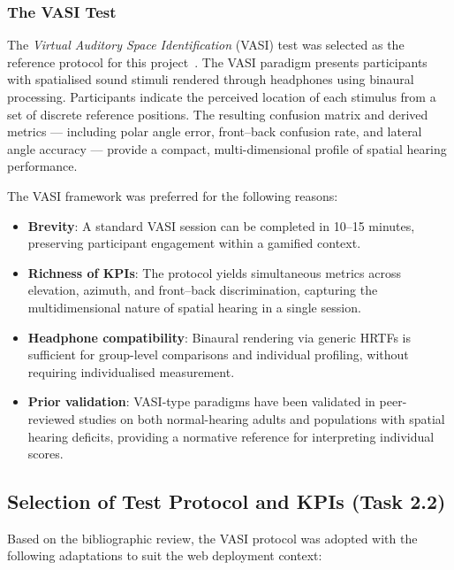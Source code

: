 \subsubsection{The VASI Test}

The \textit{Virtual Auditory Space Identification} (VASI) test was selected as the
reference protocol for this project~\cite{vasi}. The VASI paradigm presents
participants with spatialised sound stimuli rendered through headphones using
binaural processing. Participants indicate the perceived location of each stimulus
from a set of discrete reference positions. The resulting confusion matrix and
derived metrics — including polar angle error, front–back confusion rate, and
lateral angle accuracy — provide a compact, multi-dimensional profile of spatial
hearing performance.

The VASI framework was preferred for the following reasons:

\begin{itemize}
    \item \textbf{Brevity}: A standard VASI session can be completed in 10–15 minutes,
    preserving participant engagement within a gamified context.
    \item \textbf{Richness of KPIs}: The protocol yields simultaneous metrics across
    elevation, azimuth, and front–back discrimination, capturing the multidimensional
    nature of spatial hearing in a single session.
    \item \textbf{Headphone compatibility}: Binaural rendering via generic HRTFs is
    sufficient for group-level comparisons and individual profiling, without requiring
    individualised measurement.
    \item \textbf{Prior validation}: VASI-type paradigms have been validated in
    peer-reviewed studies on both normal-hearing adults and populations with spatial
    hearing deficits, providing a normative reference for interpreting individual scores.
\end{itemize}

\subsection{Selection of Test Protocol and KPIs (Task 2.2)}

Based on the bibliographic review, the VASI protocol was adopted with the following
adaptations to suit the web deployment context:

